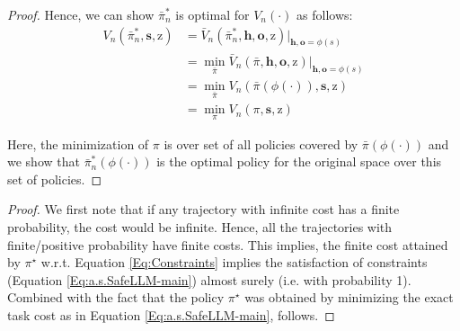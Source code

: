 \begin{proof}
Hence, we can show $\bar{\pi}_n^{*}$ is optimal for $V_n(\cdot)$ as follows:
\begin{align}
     V_n(\bar{\pi}_n^{*},\mathbf{s}, \text{z})&=\bar{V}_n(\bar{\pi}_n^{*}, \mathbf{h},\mathbf{o},\text{z})\Big|_{\mathbf{h},\mathbf{o}=\phi(s)}\\
     &=\min_{\bar{\pi}}\bar{V}_n(\bar{\pi}, \mathbf{h},\mathbf{o},\text{z})\Big|_{\mathbf{h},\mathbf{o}=\phi(s)}\\
     &=\min_{\bar{\pi}}V_n(\bar{\pi}(\phi(\cdot)), \mathbf{s},\text{z})\\
     &=\min_{\pi}V_n(\pi, \mathbf{s},\text{z})
\end{align}

Here, the minimization of $\pi$ is over set of all policies covered by $\bar{\pi}(\phi(\cdot))$ and we show that $\bar{\pi}_n^{*}(\phi(\cdot))$ is the optimal policy for the original space over this set of policies. 



\end{proof}


\thmalmostsure*
\begin{proof}
 We first note that if any trajectory with infinite cost has a finite probability, the cost would be infinite. Hence, all the trajectories with finite/positive probability have finite costs. This implies, the finite cost attained by  $\pi^\star$ w.r.t. Equation \ref{Eq:Constraints} implies the satisfaction of constraints (Equation \ref{Eq:a.s.SafeLLM-main}) almost surely (i.e. with probability 1). Combined with the fact that the policy $\pi^\star$ was obtained by minimizing the exact task cost as in Equation \ref{Eq:a.s.SafeLLM-main},  follows.
\end{proof}



















